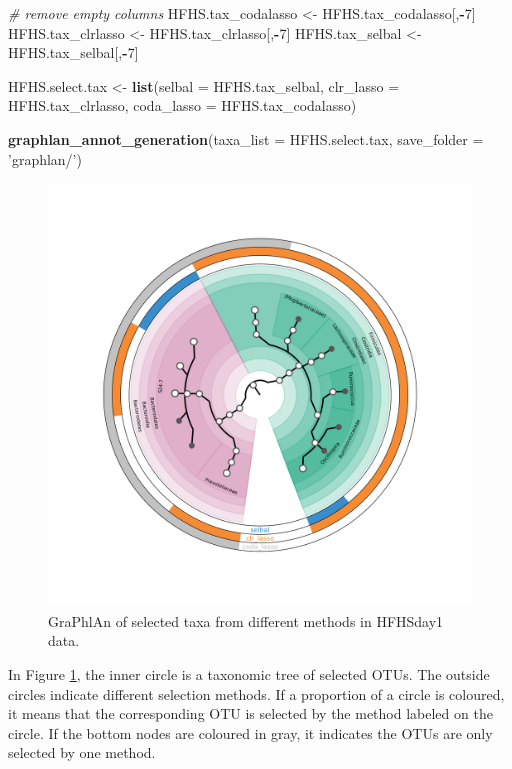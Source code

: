 \documentclass[openany]{book}
\newenvironment{Shaded}{\begin{snugshade}}{\end{snugshade}}
\newcommand{\KeywordTok}[1]{\textcolor[rgb]{0.13,0.29,0.53}{\textbf{#1}}}
\newcommand{\DataTypeTok}[1]{\textcolor[rgb]{0.13,0.29,0.53}{#1}}
\newcommand{\DecValTok}[1]{\textcolor[rgb]{0.00,0.00,0.81}{#1}}
\newcommand{\StringTok}[1]{\textcolor[rgb]{0.31,0.60,0.02}{#1}}
\newcommand{\CommentTok}[1]{\textcolor[rgb]{0.56,0.35,0.01}{\textit{#1}}}
\newcommand{\OperatorTok}[1]{\textcolor[rgb]{0.81,0.36,0.00}{\textbf{#1}}}
\newcommand{\NormalTok}[1]{#1}
\begin{document}
\begin{Shaded}
\begin{Highlighting}[]
\CommentTok{# remove empty columns}
\NormalTok{HFHS.tax_codalasso <-}\StringTok{ }\NormalTok{HFHS.tax_codalasso[,}\OperatorTok{-}\DecValTok{7}\NormalTok{] }
\NormalTok{HFHS.tax_clrlasso <-}\StringTok{ }\NormalTok{HFHS.tax_clrlasso[,}\OperatorTok{-}\DecValTok{7}\NormalTok{]}
\NormalTok{HFHS.tax_selbal <-}\StringTok{ }\NormalTok{HFHS.tax_selbal[,}\OperatorTok{-}\DecValTok{7}\NormalTok{]}

\NormalTok{HFHS.select.tax <-}\StringTok{ }\KeywordTok{list}\NormalTok{(}\DataTypeTok{selbal =}\NormalTok{ HFHS.tax_selbal,}
                        \DataTypeTok{clr_lasso =}\NormalTok{ HFHS.tax_clrlasso,}
                        \DataTypeTok{coda_lasso =}\NormalTok{ HFHS.tax_codalasso)}

\KeywordTok{graphlan_annot_generation}\NormalTok{(}\DataTypeTok{taxa_list =}\NormalTok{ HFHS.select.tax, }\DataTypeTok{save_folder =} \StringTok{'graphlan/'}\NormalTok{)}
\end{Highlighting}
\end{Shaded}

\begin{figure}

{\centering \includegraphics[width=1\linewidth]{./graphlan/taxa} 

}

\caption{GraPhlAn of selected taxa from different methods in HFHSday1 data.}\label{fig:graphlanHFHS}
\end{figure}

In Figure \ref{fig:graphlanHFHS}, the inner circle is a taxonomic tree
of selected OTUs. The outside circles indicate different selection
methods. If a proportion of a circle is coloured, it means that the
corresponding OTU is selected by the method labeled on the circle. If
the bottom nodes are coloured in gray, it indicates the OTUs are only
selected by one method.


\end{document}
